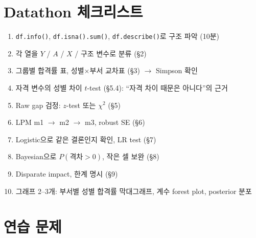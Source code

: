\documentclass[11pt,a4paper]{article}
\newcommand{\code}[1]{\texttt{#1}}
\begin{document}
\section{Datathon 체크리스트}
\begin{enumerate}
\item \code{df.info()}, \code{df.isna().sum()}, \code{df.describe()}로 구조 파악 (10분)
\item 각 열을 $Y$ / $A$ / $X$ / 구조 변수로 분류 (\S2)
\item 그룹별 합격률 표, 성별$\times$부서 교차표 (\S3) $\to$ Simpson 확인
\item 자격 변수의 성별 차이 $t$-test (\S5.4): ``자격 차이 때문은 아니다''의 근거
\item Raw gap 검정: $z$-test 또는 $\chi^2$ (\S5)
\item LPM m1 $\to$ m2 $\to$ m3, robust SE (\S6)
\item Logistic으로 같은 결론인지 확인, LR test (\S7)
\item Bayesian으로 $P(\text{격차}>0)$, 작은 셀 보완 (\S8)
\item Disparate impact, 한계 명시 (\S9)
\item 그래프 2–3개: 부서별 성별 합격률 막대그래프, 계수 forest plot, posterior 분포
\end{enumerate}

\newpage
\section{연습 문제}
\end{document}
